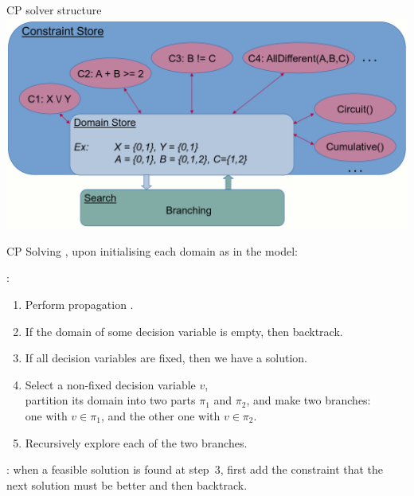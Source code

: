 \documentclass{cons-beamer}
\begin{document}
\begin{frame}{CP solver structure}
  \centering
  \includegraphics[height=70mm]{images/cp_domain_store.png}
\end{frame}

\begin{frame}{CP Solving}
  , upon initialising each domain as in the model: \vfill

  :
  \begin{enumerate}
    \item Perform propagation .
    \item If the domain of some decision variable is empty, then
      backtrack.
    \item If all decision variables are fixed, then we have a solution.
    \item Select a non-fixed decision variable $v$, \\ partition its
      domain into two parts $\pi_1$ and $\pi_2$, and make two branches: \\
      one with $v \in \pi_1$, and the other one with $v \in \pi_2$.
    \item Recursively explore each of the two branches.
  \end{enumerate}
  \vfill

  : when a feasible solution is found
  at step~3, first add the constraint that the next solution must
  be better and then backtrack.
\end{frame}
\end{document}
